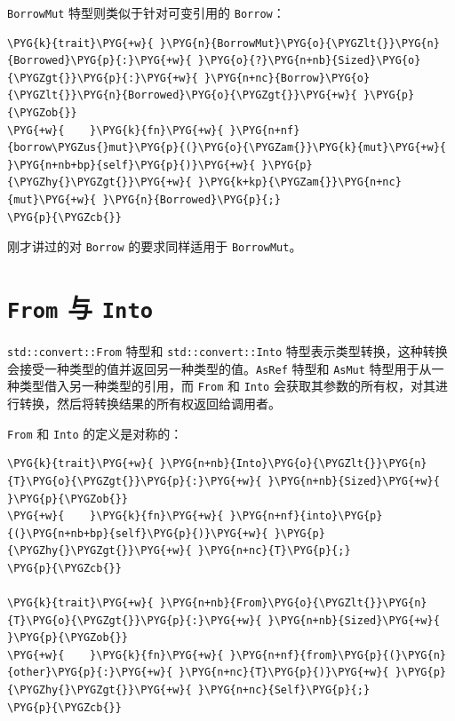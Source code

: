 \texttt{BorrowMut} 特型则类似于针对可变引用的 \texttt{Borrow}：

\begin{Verbatim}[commandchars=\\\{\},breaklines=true,breakanywhere=true,fontsize=\codefont,xleftmargin=17bp]
\PYG{k}{trait}\PYG{+w}{ }\PYG{n}{BorrowMut}\PYG{o}{\PYGZlt{}}\PYG{n}{Borrowed}\PYG{p}{:}\PYG{+w}{ }\PYG{o}{?}\PYG{n+nb}{Sized}\PYG{o}{\PYGZgt{}}\PYG{p}{:}\PYG{+w}{ }\PYG{n+nc}{Borrow}\PYG{o}{\PYGZlt{}}\PYG{n}{Borrowed}\PYG{o}{\PYGZgt{}}\PYG{+w}{ }\PYG{p}{\PYGZob{}}
\PYG{+w}{    }\PYG{k}{fn}\PYG{+w}{ }\PYG{n+nf}{borrow\PYGZus{}mut}\PYG{p}{(}\PYG{o}{\PYGZam{}}\PYG{k}{mut}\PYG{+w}{ }\PYG{n+nb+bp}{self}\PYG{p}{)}\PYG{+w}{ }\PYG{p}{\PYGZhy{}\PYGZgt{}}\PYG{+w}{ }\PYG{k+kp}{\PYGZam{}}\PYG{n+nc}{mut}\PYG{+w}{ }\PYG{n}{Borrowed}\PYG{p}{;}
\PYG{p}{\PYGZcb{}}
\end{Verbatim}

刚才讲过的对 \texttt{Borrow} 的要求同样适用于 \texttt{BorrowMut}。

\section{\texttt{From} 与 \texttt{Into}}

\texttt{std::convert::From} 特型和 \texttt{std::convert::Into} 特型表示类型转换，这种转换会接受一种类型的值并返回另一种类型的值。\texttt{AsRef} 特型和 \texttt{AsMut} 特型用于从一种类型借入另一种类型的引用，而 \texttt{From} 和 \texttt{Into} 会获取其参数的所有权，对其进行转换，然后将转换结果的所有权返回给调用者。

\texttt{From} 和 \texttt{Into} 的定义是对称的：

\begin{Verbatim}[commandchars=\\\{\},breaklines=true,breakanywhere=true,fontsize=\codefont,xleftmargin=17bp]
\PYG{k}{trait}\PYG{+w}{ }\PYG{n+nb}{Into}\PYG{o}{\PYGZlt{}}\PYG{n}{T}\PYG{o}{\PYGZgt{}}\PYG{p}{:}\PYG{+w}{ }\PYG{n+nb}{Sized}\PYG{+w}{ }\PYG{p}{\PYGZob{}}
\PYG{+w}{    }\PYG{k}{fn}\PYG{+w}{ }\PYG{n+nf}{into}\PYG{p}{(}\PYG{n+nb+bp}{self}\PYG{p}{)}\PYG{+w}{ }\PYG{p}{\PYGZhy{}\PYGZgt{}}\PYG{+w}{ }\PYG{n+nc}{T}\PYG{p}{;}
\PYG{p}{\PYGZcb{}}

\PYG{k}{trait}\PYG{+w}{ }\PYG{n+nb}{From}\PYG{o}{\PYGZlt{}}\PYG{n}{T}\PYG{o}{\PYGZgt{}}\PYG{p}{:}\PYG{+w}{ }\PYG{n+nb}{Sized}\PYG{+w}{ }\PYG{p}{\PYGZob{}}
\PYG{+w}{    }\PYG{k}{fn}\PYG{+w}{ }\PYG{n+nf}{from}\PYG{p}{(}\PYG{n}{other}\PYG{p}{:}\PYG{+w}{ }\PYG{n+nc}{T}\PYG{p}{)}\PYG{+w}{ }\PYG{p}{\PYGZhy{}\PYGZgt{}}\PYG{+w}{ }\PYG{n+nc}{Self}\PYG{p}{;}
\PYG{p}{\PYGZcb{}}
\end{Verbatim}

